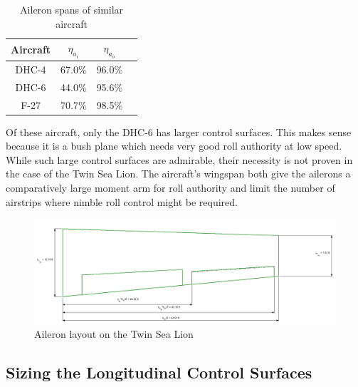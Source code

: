 \documentclass[conf]{new-aiaa}
\begin{document}
\begin{table}[H]
\centering
\caption{Aileron spans of similar aircraft}
\begin{tabular}{|c|c|c|c|}\hline
    Aircraft & $\eta_{a_i}$ & $\eta_{a_o}$ \\ \hline
    DHC-4 & 67.0\%          & 96.0\%        \\ \hline
    DHC-6 & 44.0\%          & 95.6\%        \\ \hline
    F-27  & 70.7\%          & 98.5\%        \\ \hline
\end{tabular}
\label{tab:similar_ailerons}
\end{table}

Of these aircraft, only the DHC-6 has larger control surfaces. This makes sense because it is a bush plane which needs very good roll authority at low speed. While such large control surfaces are admirable, their necessity is not proven in the case of the Twin Sea Lion. The aircraft's wingspan both give the ailerons a comparatively large moment arm for roll authority and limit the number of airstrips where nimble roll control might be required.


\begin{figure}[H]
    \includegraphics[width=\textwidth]{Report3Printouts/Wing_and_Aileron/aileron_sizing_plot.png}
    \caption{Aileron layout on the Twin Sea Lion}
    \label{fig:aileron_sizing_plot}
\end{figure}

\subsection{Sizing the Longitudinal Control Surfaces}
\end{document}
